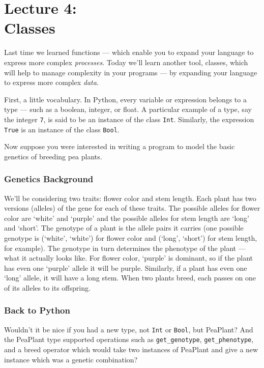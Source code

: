 \part*{Lecture 4: \\Classes}

Last time we learned functions --- which enable you to expand your language to express more complex \emph{processes}.
Today we'll learn another tool, classes, which will help to manage complexity in your programs --- by expanding your language to express more complex \emph{data}.

First, a little vocabulary. In Python, every variable or expression belongs to a type --- such as a boolean, integer, or float. A particular example of a type, say the integer \texttt{7}, is said to be an instance of the class \texttt{Int}. Similarly, the expression \texttt{True} is an instance of the class \texttt{Bool}.

Now suppose you were interested in writing a program to model the basic genetics of breeding pea plants. 

\section*{Genetics Background}
We'll be considering two traits: flower color and stem length. Each plant has two versions (alleles) of the gene for each of these traits. 
The possible alleles for flower color are `white' and `purple' and the possible alleles for stem length are `long' and `short'.
The genotype of a plant is the allele pairs it carries (one possible genotype is (`white', `white') for flower color and (`long', `short') for stem length, for example).
The genotype in turn determines the phenotype of the plant --- what it actually looks like. For flower color, `purple' is dominant, so if the plant has even one `purple' allele it will be purple.
Similarly, if a plant has even one `long' allele, it will have a long stem. When two plants breed, each passes on one of its alleles to its offspring.

\section*{Back to Python}
Wouldn't it be nice if you had a new type, not \texttt{Int} or \texttt{Bool}, but PeaPlant? And the PeaPlant type supported operations such as \texttt{get\_genotype}, \texttt{get\_phenotype}, and a breed operator which would take two
instances of PeaPlant and give a new instance which was a genetic combination?

